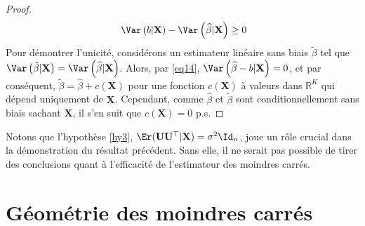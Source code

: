 \begin{proof}
\begin{align*}
\ \Var\left(b | \mathbf{X}\right) - \Var\left(\widehat{\beta}| \mathbf{X}\right) \geq 0
\end{align*}
Pour démontrer l'unicité, considérons un estimateur linéaire sans biais $\tilde{\beta}$ tel que $\Var\left(\tilde{\beta}|\mathbf{X}\right)=\Var\left(\widehat{\beta}|\mathbf{X}\right)$. Alors, par \eqref{eq14}, $\Var\left(\widehat{\beta} - b | \mathbf{X}\right) = 0$, et par conséquent, $\tilde{\beta} = \widehat{\beta}+c(\mathbf{X})$ pour une fonction $c(\mathbf{X})$ à valeurs dans $\mathbb{R}^K$ qui dépend uniquement de $\mathbf{X}$. Cependant, comme $\widehat{\beta}$ et $\tilde{\beta}$ sont conditionnellement sans biais sachant $\mathbf{X}$, il s'en suit que $c(\mathbf{X}) = 0$  p.s.
\end{proof}
Notons que l'hypothèse \ref{hy3}, $\Er(\mathbf{U}\mathbf{U}^\top|\mathbf{X})=\sigma^2\Id_n$, joue un rôle crucial dans la démonstration du résultat précédent. Sans elle, il ne serait pas possible de tirer des conclusions quant à  l'efficacité de l'estimateur des moindres carrés.

\newpage
\section{Géométrie des moindres carrés}
